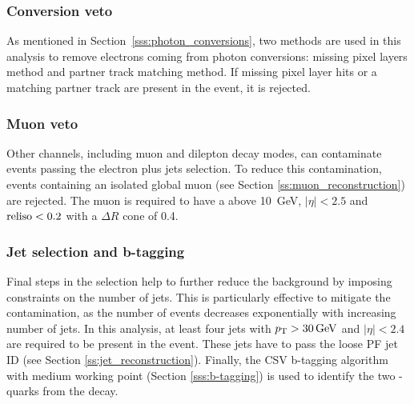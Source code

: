 
\subsubsection*{Conversion veto}
As mentioned in Section~\ref{sss:photon_conversions}, two methods are used in this analysis to remove electrons coming
from photon conversions: missing pixel layers method and partner track matching method. If missing pixel layer hits or a
matching partner track are present in the event, it is rejected.

\subsubsection*{Muon veto}
Other \ttbar channels, including muon and dilepton decay modes, can contaminate events passing the electron plus jets
selection. To reduce this contamination, events containing an isolated global muon (see Section
\ref{ss:muon_reconstruction}) are rejected. The muon is required to have a \pt above \SI{10}{\GeV}, $|\eta| < 2.5$ and
$\textrm{reliso} < 0.2$ with a $\Delta R$ cone of \num{0.4}.

\subsubsection*{Jet selection and b-tagging}
Final steps in the selection help to further reduce the background by imposing constraints on the number of jets. This
is particularly effective to mitigate the \WpJets contamination, as the number of \WpJets events decreases exponentially
with increasing number of jets. In this analysis, at least four jets with $\pt > \SI{30}{\GeV}$ and $|\eta| < 2.4$ are
required to be present in the event. These jets have to pass the loose PF jet ID (see Section
\ref{ss:jet_reconstruction}). Finally, the CSV b-tagging algorithm with medium working point (Section
\ref{sss:b-tagging}) is used to identify the two \cPqb-quarks from the \ttbar decay.

